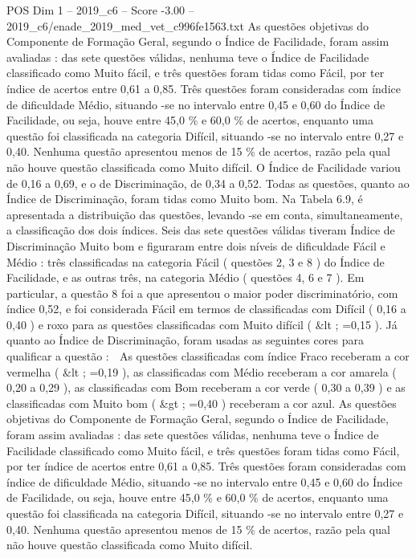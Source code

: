 \begin{textsample}{POS Dim 1 – 2019\_c6 – Score -3.00 – 2019\_c6/enade\_2019\_med\_vet\_c996fe1563.txt}
As questões objetivas do Componente de Formação Geral, segundo o Índice de Facilidade, foram assim avaliadas : das sete questões válidas, nenhuma teve o Índice de Facilidade classificado como Muito fácil, e três questões foram tidas como Fácil, por ter índice de acertos entre 0,61 a 0,85.
Três questões foram consideradas com índice de dificuldade Médio, situando -se no intervalo entre 0,45 e 0,60 do Índice de Facilidade, ou seja, houve entre 45,0 \% e 60,0 \% de acertos, enquanto uma questão foi classificada na categoria Difícil, situando -se no intervalo entre 0,27 e 0,40.
Nenhuma questão apresentou menos de 15 \% de acertos, razão pela qual não houve questão classificada como Muito difícil.
O Índice de Facilidade variou de 0,16 a 0,69, e o de Discriminação, de 0,34 a 0,52.
Todas as questões, quanto ao Índice de Discriminação, foram tidas como Muito bom.
Na Tabela 6.9, é apresentada a distribuição das questões, levando -se em conta, simultaneamente, a classificação dos dois índices.
Seis das sete questões válidas tiveram Índice de Discriminação Muito bom e figuraram entre dois níveis de dificuldade Fácil e Médio : três classificadas na categoria Fácil ( questões 2, 3 e 8 ) do Índice de Facilidade, e as outras três, na categoria Médio ( questões 4, 6 e 7 ).
Em particular, a questão 8 foi a que apresentou o maior poder discriminatório, com índice 0,52, e foi considerada Fácil em termos de classificadas com Difícil ( 0,16 a 0,40 ) e roxo para as questões classificadas com Muito difícil ( \&lt ; =0,15 ).
Já quanto ao Índice de Discriminação, foram usadas as seguintes cores para qualificar a questão :  As questões classificadas com índice Fraco receberam a cor vermelha ( \&lt ; =0,19 ), as classificadas com Médio receberam a cor amarela ( 0,20 a 0,29 ), as classificadas com Bom receberam a cor verde ( 0,30 a 0,39 ) e as classificadas com Muito bom ( \&gt ; =0,40 ) receberam a cor azul.
As questões objetivas do Componente de Formação Geral, segundo o Índice de Facilidade, foram assim avaliadas : das sete questões válidas, nenhuma teve o Índice de Facilidade classificado como Muito fácil, e três questões foram tidas como Fácil, por ter índice de acertos entre 0,61 a 0,85.
Três questões foram consideradas com índice de dificuldade Médio, situando -se no intervalo entre 0,45 e 0,60 do Índice de Facilidade, ou seja, houve entre 45,0 \% e 60,0 \% de acertos, enquanto uma questão foi classificada na categoria Difícil, situando -se no intervalo entre 0,27 e 0,40.
Nenhuma questão apresentou menos de 15 \% de acertos, razão pela qual não houve questão classificada como Muito difícil.

\end{textsample}
